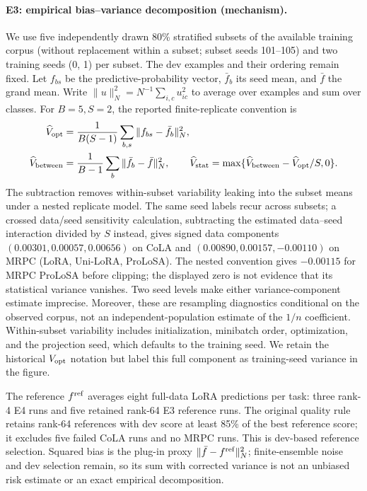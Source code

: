 


\paragraph{E3: empirical bias--variance decomposition (mechanism).}
We use five independently drawn 80\% stratified subsets of the available training corpus (without replacement within a subset; subset seeds 101--105) and two training seeds (0, 1) per subset. The dev examples and their ordering remain fixed. Let $f_{bs}$ be the predictive-probability vector, $\bar f_b$ its seed mean, and $\bar f$ the grand mean. Write $\|u\|_N^2=N^{-1}\sum_{i,c}u_{ic}^2$ to average over examples and sum over classes. For $B=5,S=2$, the reported finite-replicate convention is
\begin{align}
 \widehat V_{\rm opt}&=\frac{1}{B(S-1)}\sum_{b,s}\|f_{bs}-\bar f_b\|_N^2,\\
 \widehat V_{\rm between}&=\frac{1}{B-1}\sum_b\|\bar f_b-\bar f\|_N^2,\qquad
 \widehat V_{\rm stat}=\max\{\widehat V_{\rm between}-\widehat V_{\rm opt}/S,0\}.
\end{align}
The subtraction removes within-subset variability leaking into the subset means under a nested replicate model. The same seed labels recur across subsets; a crossed data/seed sensitivity calculation, subtracting the estimated data--seed interaction divided by $S$ instead, gives signed data components $(0.00301,0.00057,0.00656)$ on CoLA and $(0.00890,0.00157,-0.00110)$ on MRPC (LoRA, Uni-LoRA, ProLoSA). The nested convention gives $-0.00115$ for MRPC ProLoSA before clipping; the displayed zero is not evidence that its statistical variance vanishes. Two seed levels make either variance-component estimate imprecise. Moreover, these are resampling diagnostics conditional on the observed corpus, not an independent-population estimate of the $1/n$ coefficient.
Within-subset variability includes initialization, minibatch order, optimization, and the projection seed, which defaults to the training seed. We retain the historical $V_{\rm opt}$ notation but label this full component as training-seed variance in the figure.

The reference $f^{\rm ref}$ averages eight full-data LoRA predictions per task: three rank-4 E4 runs and five retained rank-64 E3 reference runs. The original quality rule retains rank-64 references with dev score at least 85\% of the best reference score; it excludes five failed CoLA runs and no MRPC runs. This is dev-based reference selection. Squared bias is the plug-in proxy $\|\bar f-f^{\rm ref}\|_N^2$; finite-ensemble noise and dev selection remain, so its sum with corrected variance is not an unbiased risk estimate or an exact empirical decomposition.

